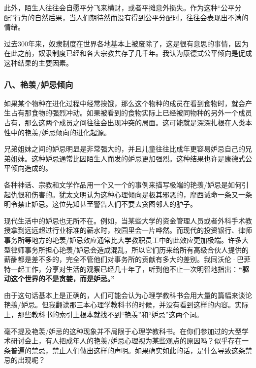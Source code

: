此外，陌生人往往会自愿平分飞来横财，或者平摊意外损失。作为这种“公平分配”行为的自然后果，当人们期待然而没有得到公平分配时，往往会表现出不满的情绪。
\par

过去300年来，奴隶制度在世界各地基本上被废除了，这是很有意思的事情，因为在此之前，奴隶制度已经和各大宗教共存了几千年。我认为康德式公平倾向是促成这种结果的主要因素。
\par

\subsubsection*{八、艳羡/妒忌倾向}

如果某个物种在进化过程中经常挨饿，那么这个物种的成员在看到食物时，就会产生占有那食物的强烈冲动。如果被看到的食物实际上已经被同物种的另外一个成员占有，那么这两个成员之间往往会出现冲突的局面。这可能就是深深扎根在人类本性中的艳羡/妒忌倾向的进化起源。
\par

兄弟姐妹之间的妒忌明显是非常强大的，并且儿童往往比成年更容易妒忌自己的兄弟姐妹。这种妒忌通常比因陌生人而发的妒忌更加强烈。这种结果也许是康德式公平倾向造成的。
\par

各种神话、宗教和文学作品用一个又一个的事例来描写极端的艳羡/妒忌是如何引起仇恨和伤害的。犹太文明认为这种心理倾向是极其邪恶的，摩西诫命一条又一条明令禁止妒忌。这位先知甚至警告人们不要去贪图邻人的驴子。
\par

现代生活中的妒忌也无所不在。例如，当某些大学的资金管理人员或者外科手术教授拿到远远超过行业标准的薪水时，校园里会一片哗然。而现代的投资银行、律师事务所等地方的艳羡/妒忌效应通常比大学教职员工中的此效应更加极端。许多大型律师事务所担心艳羡/妒忌会造成混乱，所以它们历来给所有高级合伙人提供的薪酬都是差不多的，完全不管他们对事务所的贡献有多大的差别。我同沃伦·巴菲特一起工作，分享对生活的观察已经几十年了，听到他不止一次明智地指出：\textbf{“驱动这个世界的不是贪婪，而是妒忌。”}
\par

由于这句话基本上是正确的，人们可能会认为心理学教科书会用大量的篇幅来谈论艳羡/妒忌。但我翻读那三本心理学教科书的时候，并没有看到这样的内容。实际上，那些教科书的索引上根本就找不到“艳羡”和“妒忌”这两个词。
\par

毫不提及艳羡/妒忌的这种现象并不局限于心理学教科书。在你们参加过的大型学术研讨会上，有人把成年人的艳羡/妒忌心理视为某些观点的原因吗？似乎存在一条普遍的禁忌，禁止人们做出这样的声明。如果确实如此的话，是什么导致这条禁忌的出现呢？
\par

